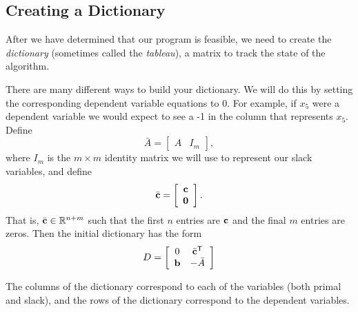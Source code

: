 
\subsection*{Creating a Dictionary} %

After we have determined that our program is feasible, we need to create the \emph{dictionary} (sometimes called the \emph{tableau}), a matrix to track the state of the algorithm.

There are many different ways to build your dictionary.
We will do this by setting the corresponding dependent variable equations to 0. For example, if $x_5$ were a dependent variable we would expect to see a -1 in the column that represents $x_5$.
Define \[\bar{A} = \left[\begin{array}{cc} A & I_m \end{array}\right],\]
where $I_m$ is the $m \times m$ identity matrix we will use to represent our slack variables, and define
\[\bar{\mathbf{c}} = \left[\begin{array}{c}\mathbf{c}\\ \mathbf{0}\end{array}\right].\]
That is, $\bar{\mathbf{c}} \in \mathbb{R}^{n+m}$ such that the first $n$ entries are $\mathbf{c}$ and the final $m$ entries are zeros.
Then the initial dictionary has the form
\begin{equation}
D =
\left[\begin{array}{ccc}
0  & \bar{\mathbf{c}}^{\mathsf T} \\
\mathbf{b} &  -\bar{A}
\end{array}\right]
\label{eqn:hand_tab}
\end{equation}

The columns of the dictionary correspond to each of the variables (both primal and slack), and the rows of the dictionary correspond to the dependent variables.

